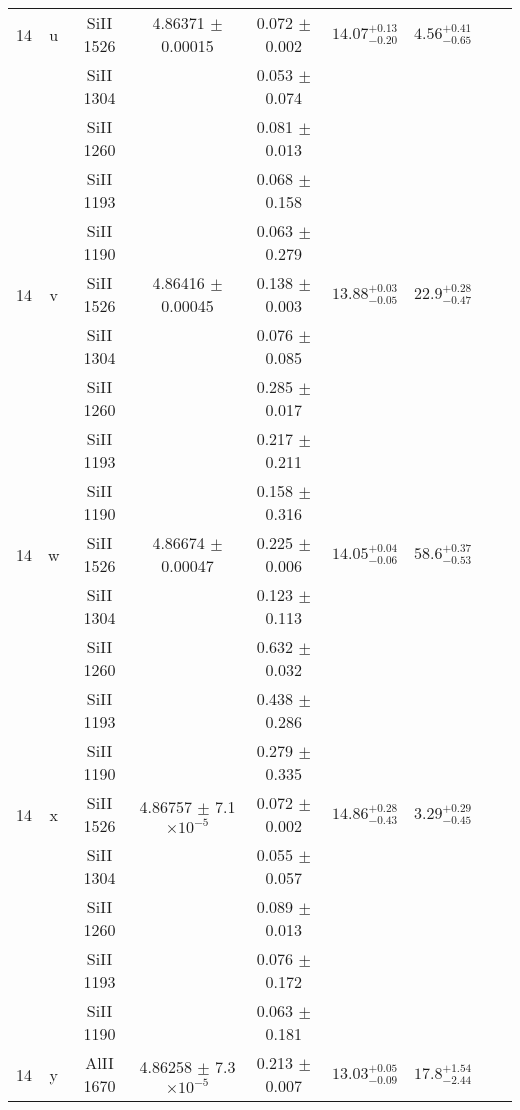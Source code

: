 \documentclass[12pt]{article}
\begin{document}
\begin{footnotesize}
\begin{longtable}{ c c c c c c c c c}
      14  & u  & SiII     1526  &  4.86371 $\pm$ 0.00015  &  0.072 $\pm$ 0.002   & $14.07_{ - 0.20}^{ + 0.13}$  & $4.56_{ - 0.65}^{ + 0.41}$    & 	 & \\ 
  &   & SiII     1304  &  &  0.053 $\pm$ 0.074   &   &     & 	 & \\ 
  &   & SiII     1260  &  &  0.081 $\pm$ 0.013   &   &     & 	 & \\ 
  &   & SiII     1193  &  &  0.068 $\pm$ 0.158   &   &     & 	 & \\ 
  &   & SiII     1190  &  &  0.063 $\pm$ 0.279   &   &     & 	 & \\ 
      14  & v  & SiII     1526  &  4.86416 $\pm$ 0.00045  &  0.138 $\pm$ 0.003   & $13.88_{ - 0.05}^{ + 0.03}$  & $22.9_{ - 0.47}^{ + 0.28}$    & 	 & \\ 
  &   & SiII     1304  &  &  0.076 $\pm$ 0.085   &   &     & 	 & \\ 
  &   & SiII     1260  &  &  0.285 $\pm$ 0.017   &   &     & 	 & \\ 
  &   & SiII     1193  &  &  0.217 $\pm$ 0.211   &   &     & 	 & \\ 
  &   & SiII     1190  &  &  0.158 $\pm$ 0.316   &   &     & 	 & \\ 
      14  & w  & SiII     1526  &  4.86674 $\pm$ 0.00047  &  0.225 $\pm$ 0.006   & $14.05_{ - 0.06}^{ + 0.04}$  & $58.6_{ - 0.53}^{ + 0.37}$    & 	 & \\ 
  &   & SiII     1304  &  &  0.123 $\pm$ 0.113   &   &     & 	 & \\ 
  &   & SiII     1260  &  &  0.632 $\pm$ 0.032   &   &     & 	 & \\ 
  &   & SiII     1193  &  &  0.438 $\pm$ 0.286   &   &     & 	 & \\ 
  &   & SiII     1190  &  &  0.279 $\pm$ 0.335   &   &     & 	 & \\ 
      14  & x  & SiII     1526  &  4.86757 $\pm$ 7.1 $\times 10^{-5}$   &  0.072 $\pm$ 0.002   & $14.86_{ - 0.43}^{ + 0.28}$  & $3.29_{ - 0.45}^{ + 0.29}$    & 	 & \\ 
  &   & SiII     1304  &  &  0.055 $\pm$ 0.057   &   &     & 	 & \\ 
  &   & SiII     1260  &  &  0.089 $\pm$ 0.013   &   &     & 	 & \\ 
  &   & SiII     1193  &  &  0.076 $\pm$ 0.172   &   &     & 	 & \\ 
  &   & SiII     1190  &  &  0.063 $\pm$ 0.181   &   &     & 	 & \\ 
      14  & y  & AlII     1670  &  4.86258 $\pm$ 7.3 $\times 10^{-5}$   &  0.213 $\pm$ 0.007   & $13.03_{ - 0.09}^{ + 0.05}$  & $17.8_{ - 2.44}^{ + 1.54}$    & 	 & \\ 

\end{longtable}
\end{footnotesize}
\end{document}
